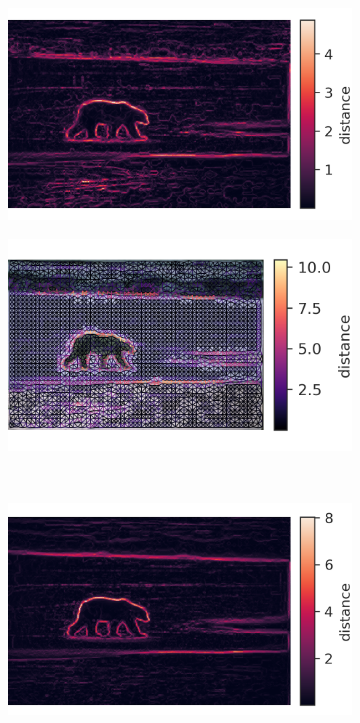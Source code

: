 \documentclass[journal]{IEEEtran}
\begin{document}
\begin{figure}[!ht]
\begin{subfigure}[b]{0.24\textwidth}
    \end{subfigure}\\ [1ex]    
    \begin{subfigure}[b]{0.24\textwidth}
        \includegraphics[width=\textwidth]{100007_cr_grad}
    \end{subfigure}     
    \begin{subfigure}[b]{0.24\textwidth}
    	\includegraphics[width=\textwidth]{100007_weighted_cr_rag} 
    \end{subfigure}\\ [1ex]          
    \begin{subfigure}[b]{0.24\textwidth}
        \includegraphics[width=\textwidth]{100007_ci_grad}

\end{subfigure}
\end{figure}
\end{document}

